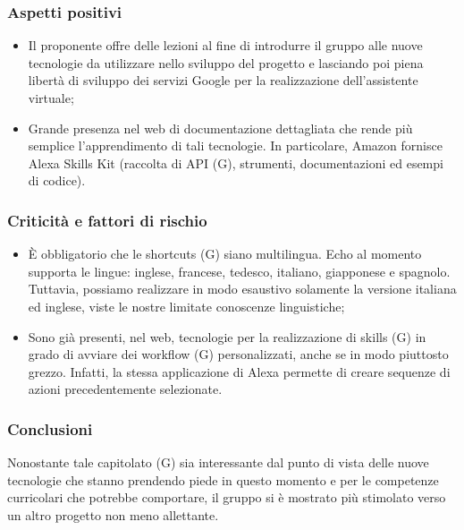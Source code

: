 \subsubsection{Aspetti positivi}
\begin{itemize}
	\item Il proponente offre delle lezioni al fine di introdurre il gruppo alle nuove tecnologie da utilizzare nello sviluppo del 				progetto e lasciando poi piena libertà di sviluppo dei servizi Google per la realizzazione dell’assistente virtuale;
	\item Grande presenza nel web di documentazione dettagliata che rende più semplice l’apprendimento di tali tecnologie. In 			particolare, Amazon fornisce Alexa Skills Kit (raccolta di API (G), strumenti, documentazioni ed esempi di codice).
\end{itemize}
\subsubsection{Criticità e fattori di rischio}
\begin{itemize}
	\item È obbligatorio che le shortcuts (G) siano multilingua. Echo al momento supporta le lingue: inglese, francese, tedesco, 			italiano, giapponese e spagnolo. Tuttavia, possiamo realizzare in modo esaustivo solamente la versione italiana ed inglese, 			viste le nostre limitate conoscenze linguistiche;
	\item Sono già presenti, nel web, tecnologie per la realizzazione di skills (G) in grado di avviare dei workflow (G) 					personalizzati, anche se in modo piuttosto grezzo. Infatti, la stessa applicazione di Alexa permette di creare sequenze di 			azioni precedentemente selezionate.
\end{itemize}
\subsubsection{Conclusioni}
Nonostante tale capitolato (G) sia interessante dal punto di vista delle nuove tecnologie che stanno prendendo piede in 				questo momento e per le competenze curricolari che potrebbe comportare, il gruppo si è mostrato più stimolato verso un 			altro progetto non meno allettante.